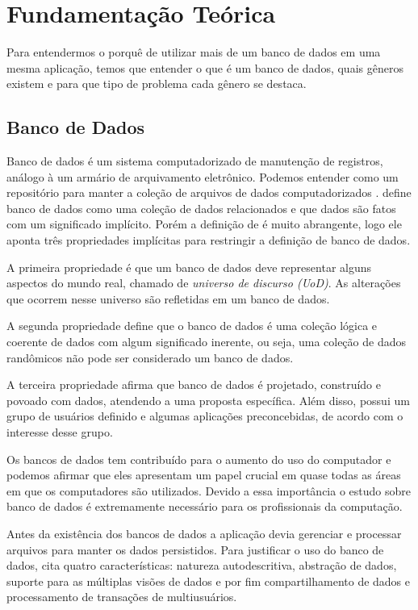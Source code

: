 \chapter{Fundamentação Teórica}
\label{chap:fundamentacaoTeorica}


Para entendermos o porquê de utilizar mais de um banco de dados em uma mesma aplicação, temos que entender o que é um banco de dados, quais gêneros existem e para que tipo de problema cada gênero se destaca.

\section{Banco de Dados}
\label{sec:database}

Banco de dados é um sistema computadorizado de manutenção de registros, análogo à um armário de arquivamento eletrônico. Podemos entender como um repositório para manter a coleção de arquivos de dados computadorizados \cite[p.3]{CJDate}.  define banco de dados como uma coleção de dados relacionados e que dados são fatos com um significado implícito. Porém a definição de  é muito abrangente, logo ele aponta três propriedades implícitas para restringir a definição de banco de dados.

A primeira propriedade é que um banco de dados deve representar alguns aspectos do mundo real, chamado de \textit{universo de discurso (UoD)}. As alterações que ocorrem nesse universo são refletidas em um banco de dados.

A segunda propriedade define que o banco de dados é uma coleção lógica e coerente de dados com algum significado inerente, ou seja, uma coleção de dados randômicos não pode ser considerado um banco de dados.

A terceira propriedade afirma que banco de dados é projetado, construído e povoado com dados, atendendo a uma proposta específica. Além disso, possui um grupo de usuários definido e algumas aplicações preconcebidas, de acordo com o interesse desse grupo.

Os bancos de dados tem contribuído para o aumento do uso do computador \cite[p.3]{Elmasri} e podemos afirmar que eles apresentam um papel crucial em quase todas as áreas em que os computadores são utilizados. Devido a essa importância o estudo sobre banco de dados é extremamente necessário para os profissionais da computação.

Antes da existência dos bancos de dados a aplicação devia gerenciar e processar arquivos para manter os dados persistidos. Para justificar o uso do banco de dados,  cita quatro características: natureza autodescritiva, abstração de dados, suporte para as múltiplas visões de dados e por fim compartilhamento de dados e processamento de transações de multiusuários.

